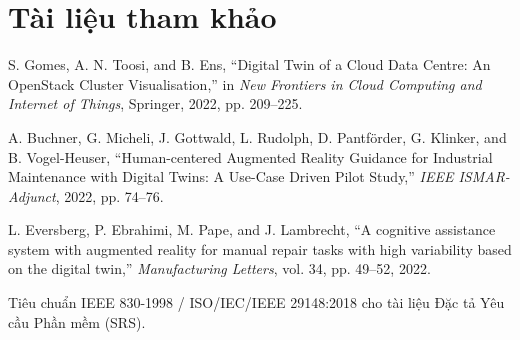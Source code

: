 \section{Tài liệu tham khảo}
\begin{enumerate}[label={[\arabic*]}]
    \item S. Gomes, A. N. Toosi, and B. Ens, “Digital Twin of a Cloud Data Centre: An OpenStack Cluster Visualisation,” in \textit{New Frontiers in Cloud Computing and Internet of Things}, Springer, 2022, pp. 209–225.
    \item A. Buchner, G. Micheli, J. Gottwald, L. Rudolph, D. Pantförder, G. Klinker, and B. Vogel-Heuser, “Human-centered Augmented Reality Guidance for Industrial Maintenance with Digital Twins: A Use-Case Driven Pilot Study,” \textit{IEEE ISMAR-Adjunct}, 2022, pp. 74–76.
    \item L. Eversberg, P. Ebrahimi, M. Pape, and J. Lambrecht, “A cognitive assistance system with augmented reality for manual repair tasks with high variability based on the digital twin,” \textit{Manufacturing Letters}, vol. 34, pp. 49–52, 2022.
    \item Tiêu chuẩn IEEE 830-1998 / ISO/IEC/IEEE 29148:2018 cho tài liệu Đặc tả Yêu cầu Phần mềm (SRS).
\end{enumerate}

